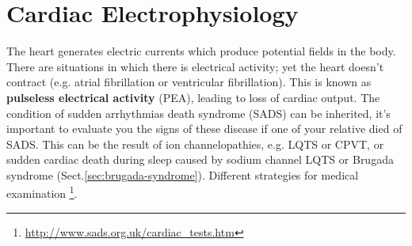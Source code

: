 \chapter{Cardiac Electrophysiology}
\label{chap:cardiac_electrophysioloy}

The heart generates electric currents which produce potential fields in the
body. There are situations in which there is electrical activity; yet the heart
doesn't contract (e.g. atrial fibrillation or ventricular fibrillation). This is
known as {\bf pulseless electrical activity} (PEA), leading to loss of cardiac
output. The condition of sudden arrhythmias death syndrome (SADS) can be
inherited, it's important to evaluate you the signs of these disease if one of
your relative died of SADS. This can be the result of ion channelopathies, e.g.
LQTS or CPVT, or sudden cardiac death during sleep caused by sodium channel LQTS
or Brugada syndrome (Sect.\ref{sec:brugada-syndrome}). Different strategies for
medical examination \footnote{\url{http://www.sads.org.uk/cardiac_tests.htm}}.

